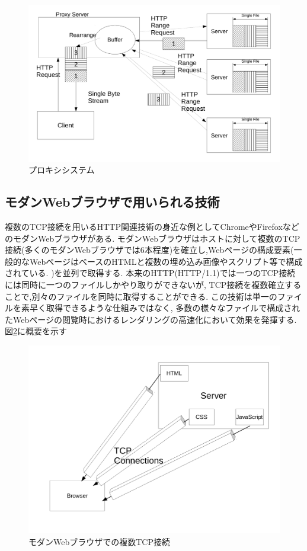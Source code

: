 \documentclass[a4j,12pt]{gradthesis_utf8}
\begin{document}
\begin{figure}[h]
	\centering
	\includegraphics[width=16cm]{figure/proxy.pdf}
	\caption{プロキシシステム}
	\label{proxysystem}
\end{figure}

\newpage

\subsection{モダンWebブラウザで用いられる技術}
複数のTCP接続を用いるHTTP関連技術の身近な例としてChromeやFirefoxなどのモダンWebブラウザがある.
モダンWebブラウザはホストに対して複数のTCP接続(多くのモダンWebブラウザでは6本程度)を確立し,Webページの構成要素(一般的なWebページはベースのHTMLと複数の埋め込み画像やスクリプト等で構成されている.
)を並列で取得する.
本来のHTTP(HTTP/1.1)では一つのTCP接続には同時に一つのファイルしかやり取りができないが,
TCP接続を複数確立することで,別々のファイルを同時に取得することができる.
この技術は単一のファイルを素早く取得できるような仕組みではなく,
多数の様々なファイルで構成されたWebページの閲覧時におけるレンダリングの高速化において効果を発揮する.
図\ref{browser}に概要を示す

\begin{figure}[h]
	\centering
	\includegraphics[width=16cm]{figure/browser.pdf}
	\caption{モダンWebブラウザでの複数TCP接続}
	\label{browser}
\end{figure}
\end{document}
